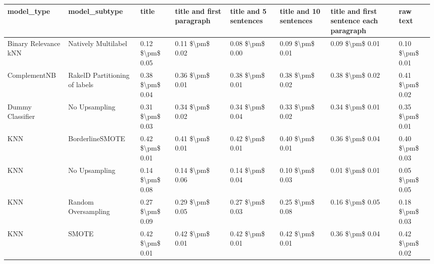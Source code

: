 \begin{tabular}{llllllll}
\toprule
                     model\_type &                 model\_subtype &           title & title and first paragraph & title and 5 sentences & title and 10 sentences & title and first sentence each paragraph &            raw text \\
\midrule
           Binary Relevance kNN &           Natively Multilabel & 0.12 \$\textbackslash pm\$ 0.05 &           0.11 \$\textbackslash pm\$ 0.02 &       0.08 \$\textbackslash pm\$ 0.00 &        0.09 \$\textbackslash pm\$ 0.01 &                         0.09 \$\textbackslash pm\$ 0.01 &     0.10 \$\textbackslash pm\$ 0.01 \\
                   ComplementNB & RakelD Partitioning of labels & 0.38 \$\textbackslash pm\$ 0.04 &           0.36 \$\textbackslash pm\$ 0.01 &       0.38 \$\textbackslash pm\$ 0.01 &        0.38 \$\textbackslash pm\$ 0.02 &                         0.38 \$\textbackslash pm\$ 0.02 &     0.41 \$\textbackslash pm\$ 0.02 \\
               Dummy Classifier &                 No Upsampling & 0.31 \$\textbackslash pm\$ 0.03 &           0.34 \$\textbackslash pm\$ 0.02 &       0.34 \$\textbackslash pm\$ 0.04 &        0.33 \$\textbackslash pm\$ 0.02 &                         0.34 \$\textbackslash pm\$ 0.01 &     0.35 \$\textbackslash pm\$ 0.01 \\
                            KNN &               BorderlineSMOTE & 0.42 \$\textbackslash pm\$ 0.01 &           0.41 \$\textbackslash pm\$ 0.01 &       0.42 \$\textbackslash pm\$ 0.01 &        0.40 \$\textbackslash pm\$ 0.01 &                         0.36 \$\textbackslash pm\$ 0.04 &     0.40 \$\textbackslash pm\$ 0.03 \\
                            KNN &                 No Upsampling & 0.14 \$\textbackslash pm\$ 0.08 &           0.14 \$\textbackslash pm\$ 0.06 &       0.14 \$\textbackslash pm\$ 0.04 &        0.10 \$\textbackslash pm\$ 0.03 &                         0.01 \$\textbackslash pm\$ 0.01 &     0.05 \$\textbackslash pm\$ 0.05 \\
                            KNN &           Random Oversampling & 0.27 \$\textbackslash pm\$ 0.09 &           0.29 \$\textbackslash pm\$ 0.05 &       0.27 \$\textbackslash pm\$ 0.03 &        0.25 \$\textbackslash pm\$ 0.08 &                         0.16 \$\textbackslash pm\$ 0.05 &     0.18 \$\textbackslash pm\$ 0.03 \\
                            KNN &                         SMOTE & 0.42 \$\textbackslash pm\$ 0.01 &           0.42 \$\textbackslash pm\$ 0.01 &       0.42 \$\textbackslash pm\$ 0.01 &        0.42 \$\textbackslash pm\$ 0.01 &                         0.36 \$\textbackslash pm\$ 0.04 &     0.42 \$\textbackslash pm\$ 0.02 \\

\end{tabular}
